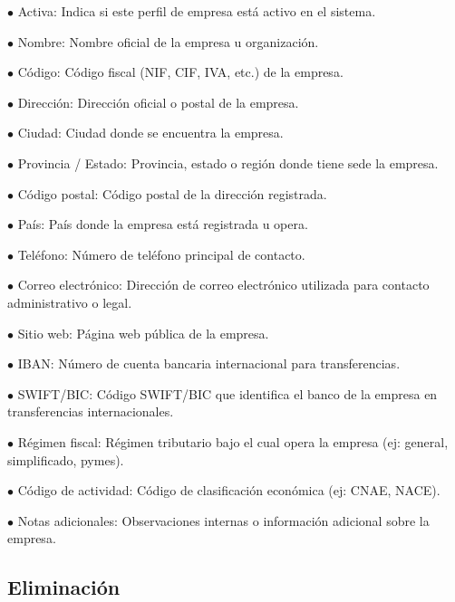 \documentclass[a4paper]{article}
\begin{document}
\begin{compactitem}
\item[\color{myblue}$\bullet$] Activa: Indica si este perfil de empresa está activo en el sistema.
\item[\color{myblue}$\bullet$] Nombre: Nombre oficial de la empresa u organización.
\item[\color{myblue}$\bullet$] Código: Código fiscal (NIF, CIF, IVA, etc.) de la empresa.
\item[\color{myblue}$\bullet$] Dirección: Dirección oficial o postal de la empresa.
\item[\color{myblue}$\bullet$] Ciudad: Ciudad donde se encuentra la empresa.
\item[\color{myblue}$\bullet$] Provincia / Estado: Provincia, estado o región donde tiene sede la empresa.
\item[\color{myblue}$\bullet$] Código postal: Código postal de la dirección registrada.
\item[\color{myblue}$\bullet$] País: País donde la empresa está registrada u opera.
\item[\color{myblue}$\bullet$] Teléfono: Número de teléfono principal de contacto.
\item[\color{myblue}$\bullet$] Correo electrónico: Dirección de correo electrónico utilizada para contacto administrativo o legal.
\item[\color{myblue}$\bullet$] Sitio web: Página web pública de la empresa.
\item[\color{myblue}$\bullet$] IBAN: Número de cuenta bancaria internacional para transferencias.
\item[\color{myblue}$\bullet$] SWIFT/BIC: Código SWIFT/BIC que identifica el banco de la empresa en transferencias internacionales.
\item[\color{myblue}$\bullet$] Régimen fiscal: Régimen tributario bajo el cual opera la empresa (ej: general, simplificado, pymes).
\item[\color{myblue}$\bullet$] Código de actividad: Código de clasificación económica (ej: CNAE, NACE).
\item[\color{myblue}$\bullet$] Notas adicionales: Observaciones internas o información adicional sobre la empresa.
\end{compactitem}

\hypertarget{toc45}{}
\subsection{Eliminación}
\end{document}

